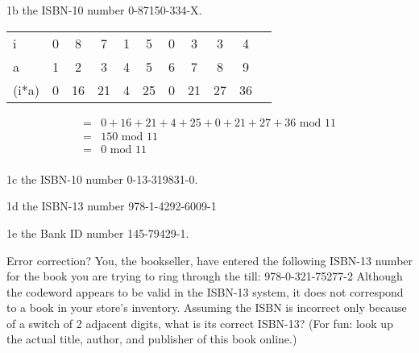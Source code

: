 \begin{question}{1b}
the ISBN-10 number 0-87150-334-X.

\begin{tabular}{l|cccccccccc}
\hline
i     & 0  & 8  & 7  & 1  & 5  & 0  & 3  & 3  & 4 \\
a     & 1  & 2  & 3  & 4  & 5  & 6  & 7  & 8  & 9 \\
\hline
(i*a) & 0  & 16 & 21 & 4  & 25 & 0  & 21 & 27 & 36
\end{tabular}

\begin{align*}
=&0  + 16 + 21 + 4  + 25 + 0  + 21 + 27 + 36\textrm{ mod } 11\\
=&150 \textrm{ mod } 11\\
=&0 \textrm{ mod } 11\\
\end{align*}
\end{question}


\begin{question}{1c}
the ISBN-10 number 0-13-319831-0.
\end{question}


\begin{question}{1d}
the ISBN-13 number 978-1-4292-6009-1
\end{question}


\begin{question}{1e}
the Bank ID number 145-79429-1.
\end{question}


\begin{question}{2}
Error correction? You, the bookseller, have entered the following ISBN-13 number for
the book you are trying to ring through the till:
978-0-321-75277-2
Although the codeword appears to be valid in the ISBN-13 system, it does not correspond
to a book in your store's inventory. Assuming the ISBN is incorrect only because of a switch
of 2 adjacent digits, what is its correct ISBN-13?
(For fun: look up the actual title, author, and publisher of this book online.)
\end{question}

